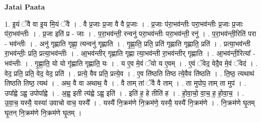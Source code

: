 \documentclass[17pt]{extarticle}
\begin{document}
\textbf{Jatai Paata} \newline

1. इ॒यं ॅवै वा इ॒य मि॒यं ॅवै । . वै प्र॒जाः प्र॒जा वै वै प्र॒जाः । . प्र॒जाः प॑रा॒भव॑न्तीः परा॒भव॑न्तीः प्र॒जाः प्र॒जाः प॑रा॒भव॑न्तीः । . प्र॒जा इति॑ प्र - जाः । . प॒रा॒भव॑न्ती॒ रन्वनु॑ परा॒भव॑न्तीः परा॒भव॑न्ती॒ रनु॑ । . प॒रा॒भव॑न्ती॒रिति॑ परा - भव॑न्तीः । . अनु॑ गृह्णाति गृह्णा॒ त्यन्वनु॑ गृह्णाति । . गृ॒ह्णा॒ति॒ प्रति॒ प्रति॑ गृह्णाति गृह्णाति॒ प्रति॑ । . प्रत्या॒भव॑न्ती रा॒भव॑न्तीः॒ प्रति॒ प्रत्या॒भव॑न्तीः । . आ॒भव॑न्तीर् गृह्णाति गृह्णा त्या॒भव॑न्ती रा॒भव॑न्तीर् गृह्णाति । . आ॒भव॑न्ती॒रित्या᳚ - भव॑न्तीः । . गृ॒ह्णा॒ति॒ यो यो गृ॑ह्णाति गृह्णाति॒ यः । . य ए॒व मे॒वं ॅयो य ए॒वम् । . ए॒वं ॅवेद॒ वेदै॒व मे॒वं ॅवेद॑ । . वेद॒ प्रति॒ प्रति॒ वेद॒ वेद॒ प्रति॑ । . प्रत्ये॒ वैव प्रति॒ प्रत्ये॒व । . ए॒व ति॑ष्ठति तिष्ठ त्ये॒वैव ति॑ष्ठति । . ति॒ष्ठ॒ त्यथाथ॑ तिष्ठति तिष्ठ॒ त्यथ॑ । . अथ॒ वै वा अथाथ॒ वै । . वै ताम् तां ॅवै वै ताम् । . ता मुपोप॒ ताम् ता मुप॑ । . उपा᳚ह्वे ऽह्व॒ उपोपा᳚ह्वे । . अ॒ह्व॒ इती त्य॑ह्वे ऽह्व॒ इति॑ । . इति॑ ह॒ हे तीति॑ ह । . हो॒वा॒चो॒ वा॒च॒ ह॒ हो॒वा॒च॒ । . उ॒वा॒च॒ यस्यै॒ यस्या॑ उवाचो वाच॒ यस्यै᳚ । . यस्यै॑ नि॒क्रम॑णे नि॒क्रम॑णे॒ यस्यै॒ यस्यै॑ नि॒क्रम॑णे । . नि॒क्रम॑णे घृ॒तम् घृ॒तन् नि॒क्रम॑णे नि॒क्रम॑णे घृ॒तम् । \newline
\end{document}
